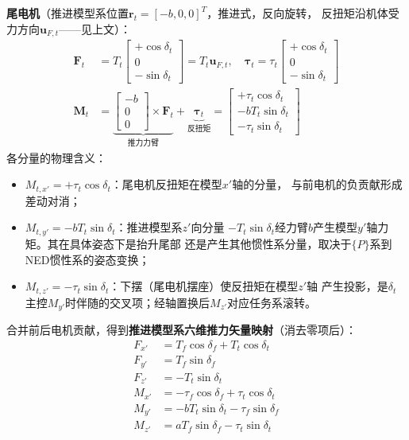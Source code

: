 \textbf{尾电机}（推进模型系位置$\bm{r}_t = [-b, 0, 0]^T$，推进式，反向旋转，
反扭矩沿机体受力方向$\bm{u}_{F,t}$——见上文）：
\begin{align}
    \bm{F}_t &= T_t \begin{bmatrix} +\cos\delta_t \\ 0 \\ -\sin\delta_t \end{bmatrix}
    = T_t \bm{u}_{F,t},
    \quad
    \bm{\tau}_t = \tau_t \begin{bmatrix} +\cos\delta_t \\ 0 \\ -\sin\delta_t \end{bmatrix}
    \label{eq:rear_force} \\
    \bm{M}_t &= \underbrace{\begin{bmatrix} -b \\ 0 \\ 0 \end{bmatrix} \times \bm{F}_t}_{\text{推力力臂}}
             + \underbrace{\bm{\tau}_t}_{\text{反扭矩}}
             = \begin{bmatrix}
                 +\tau_t \cos\delta_t \\
                 -b T_t \sin\delta_t \\
                 -\tau_t \sin\delta_t
               \end{bmatrix}
    \label{eq:rear_moment}
\end{align}
各分量的物理含义：
\begin{itemize}
    \item $M_{t,x'}=+\tau_t\cos\delta_t$：尾电机反扭矩在模型$x'$轴的分量，
          与前电机的负贡献形成差动对消；
    \item $M_{t,y'} = -b T_t \sin\delta_t$：推进模型系$z'$向分量
          $-T_t\sin\delta_t$经力臂$b$产生模型$y'$轴力矩。其在具体姿态下是抬升尾部
          还是产生其他惯性系分量，取决于$\{P\}$系到NED惯性系的姿态变换；
    \item $M_{t,z'} = -\tau_t \sin\delta_t$：下摆（尾电机摆座）使反扭矩在模型$z'$轴
          产生投影，是$\delta_t$主控$M_{y'}$时伴随的交叉项；经轴置换后$M_{z'}$对应任务系滚转。
\end{itemize}

合并前后电机贡献，得到\textbf{推进模型系六维推力矢量映射}（消去零项后）：
\begin{equation}
    \boxed{
    \begin{aligned}
        F_{x'} &= T_f \cos\delta_f + T_t \cos\delta_t \\[2pt]
        F_{y'} &= T_f \sin\delta_f \\[2pt]
        F_{z'} &= -T_t \sin\delta_t \\[6pt]
        M_{x'} &= -\tau_f \cos\delta_f + \tau_t \cos\delta_t \\[2pt]
        M_{y'} &= -b T_t \sin\delta_t - \tau_f \sin\delta_f \\[2pt]
        M_{z'} &= a T_f \sin\delta_f - \tau_t \sin\delta_t
    \end{aligned}}
    \label{eq:six_component}
\end{equation}

